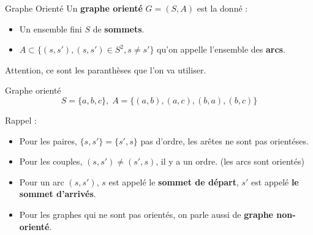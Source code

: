 
\begin{Definition}[colbacktitle=red!75!black]{Graphe Orienté}{}
Un \textbf{graphe orienté} $G=(S,A)$ est la donné :
 \begin{itemize}
    \item Un ensemble fini $S$ de \textbf{sommets}.
    \item $A \subset \{(s,s'), (s,s') \in S^2, s \ne s'\}$ qu'on appelle l'ensemble des \textbf{arcs}.
\end{itemize}

Attention, ce sont les paranthèses que l'on va utiliser.
\end{Definition}



\begin{Example}{Graphe orienté}{}
\[
    S = \{a,b,c\}, \; A = \{(a,b),(a,c),(b,a),(b,c)\}
\]

\begin{center}
\end{center}


\end{Example}

Rappel :
 \begin{itemize}
     \item Pour les paires, $\{s, s'\} = \{s', s\}$ pas d'ordre, les arêtes ne sont pas orientéses.
    \item Pour les couples,  $(s, s') \ne (s', s)$, il y a un ordre. (les arcs sont orientés)
    \item Pour un arc  $(s, s')$,  $s$ est appelé le \textbf{sommet de départ}, $s'$ est appelé \textbf{le sommet d'arrivés}.
 \end{itemize}

\begin{note}
\begin{itemize}
    \item Pour les graphes qui ne sont pas orientés, on parle aussi de \textbf{graphe non-orienté}.
\end{itemize}
\end{note}

